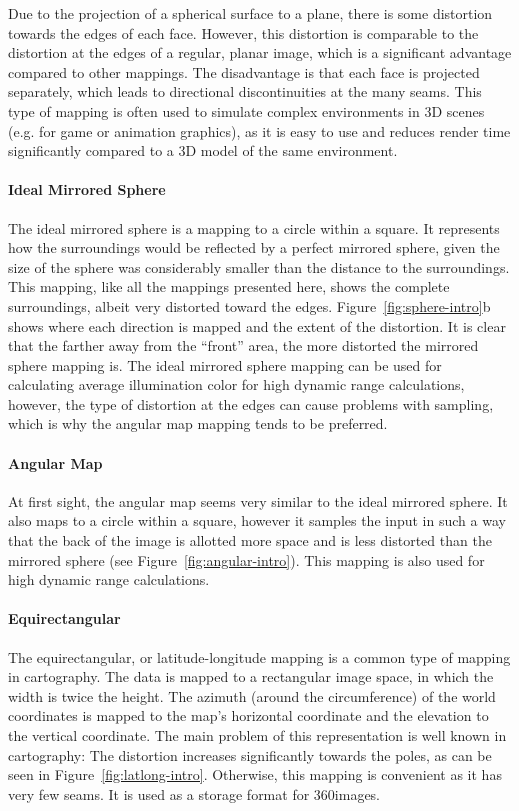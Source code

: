 Due to the projection of a spherical surface to a plane, there is some distortion towards the edges of each face. However, this distortion is comparable to the distortion at the edges of a regular, planar image, which is a significant advantage compared to other mappings. The disadvantage is that each face is projected separately, which leads to directional discontinuities at the many seams. This type of mapping is often used to simulate complex environments in 3D scenes (e.g. for game or animation graphics), as it is easy to use and reduces render time significantly compared to a 3D model of the same environment.
\cite{hdrbook}

\paragraph{Ideal Mirrored Sphere}
The ideal mirrored sphere is a mapping to a circle within a square. It represents how the surroundings would be reflected by a perfect mirrored sphere, given the size of the sphere was considerably smaller than the distance to the surroundings. This mapping, like all the mappings presented here, shows the complete surroundings, albeit very distorted toward the edges. Figure~\ref{fig:sphere-intro}b shows where each direction is mapped and the extent of the distortion. It is clear that the farther away from the ``front'' area, the more distorted the mirrored sphere mapping is. The ideal mirrored sphere mapping can be used for calculating average illumination color for high dynamic range calculations, however, the type of distortion at the edges can cause problems with sampling, which is why the angular map mapping tends to be preferred.
\cite{hdrbook}

\paragraph{Angular Map}
At first sight, the angular map seems very similar to the ideal mirrored sphere. It also maps to a circle within a square, however it samples the input in such a way that the back of the image is allotted more space and is less distorted than the mirrored sphere (see Figure~\ref{fig:angular-intro}). This mapping is also used for high dynamic range calculations.

\paragraph{Equirectangular}
The equirectangular, or latitude-longitude mapping is a common type of mapping in cartography. The data is mapped to a rectangular image space, in which the width is twice the height. The azimuth (around the circumference) of the world coordinates is mapped to the map's horizontal coordinate and the elevation to the vertical coordinate. The main problem of this representation is well known in cartography: The distortion increases significantly towards the poles, as can be seen in Figure~\ref{fig:latlong-intro}. Otherwise, this mapping is convenient as it has very few seams. It is used as a storage format for 360\degree images.

